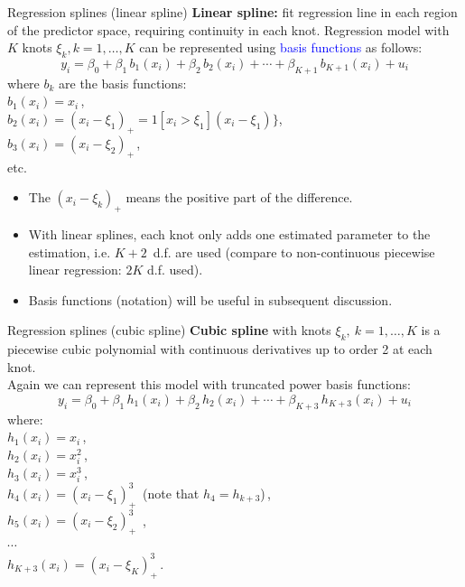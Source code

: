 \documentclass{beamer}
\begin{document}
\begin{frame}{Regression splines (linear spline)}
\textbf{Linear spline:} fit regression line in each region of the predictor space, requiring continuity in each knot. Regression model with $K$ knots $\xi_k, k=1,\dots, K$ can be represented using \textcolor{blue}{basis functions} as follows:
$$y_i = \beta_0 + \beta_1 \, b_1 (x_i) + \beta_2 \, b_2 (x_i) + \cdots  + \beta_{K+1} \, b_{K+1} (x_i) + u_i  $$
where $b_k$ are the basis functions:\\
\smallskip
\qquad $b_1 (x_i) = x_i$\,,\\
\qquad $b_2 (x_i) = (x_i-\xi_1)_{+} = 1[x_i > \xi_1](x_i-\xi_1)\}$,\\
\qquad $b_3 (x_i) = (x_i-\xi_2)_{+}$\,, \\ \qquad etc.\\
\medskip
\begin{itemize}
    \item The $(x_i-\xi_k)_{+}$ means the positive part of the difference.
    \smallskip
    \item With linear splines, each knot only adds one estimated parameter to the estimation, i.e. $K\!+\!2\,$ d.f. are used (compare to non-continuous piecewise linear regression: $2K$ d.f. used).
    \smallskip
    \item Basis functions (notation) will be useful in subsequent discussion.
\end{itemize}
\end{frame}
\begin{frame}{Regression splines (cubic spline)}
\textbf{Cubic spline} with knots $\xi_k,~k=1,\dots, K$ is a piecewise cubic polynomial with continuous derivatives up to order 2 at each knot.\\
\medskip
Again we can represent this model with truncated power basis functions:
$$y_i = \beta_0 + \beta_1 \, h_1 (x_i) + \beta_2 \, h_2 (x_i) + \cdots + \beta_{K+3} \, h_{K+3} (x_i) + u_i  $$
where:\\
\smallskip
\qquad $h_1 (x_i) = x_i$\,,\\
\smallskip
\qquad $h_2 (x_i) = x_i^2$\,,\\
\smallskip
\qquad $h_3 (x_i) = x_i^3$\,,\\
\smallskip
\qquad $h_4 (x_i) = (x_i-\xi_1)_{+}^3 \,$ \qquad (note that $h_4 = h_{k+3}$)\,,\\
\smallskip
\qquad $h_5 (x_i) = (x_i-\xi_2)_{+}^3 \,$ ,\\
\qquad $\cdots$ \\
\qquad $h_{K+3} (x_i) = (x_i-\xi_K)_{+}^3 \,$.\\
\medskip
\end{frame}
\end{document}
